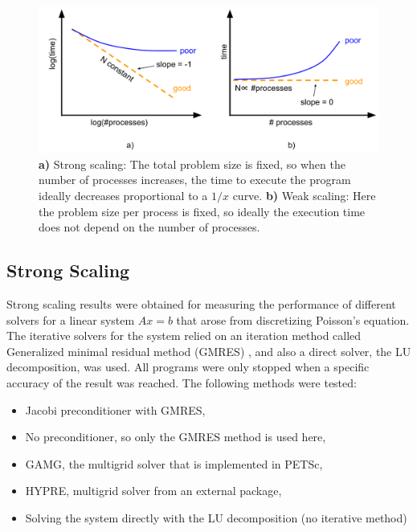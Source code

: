 \begin{figure}[tb]
	\centering
\hspace*{-7mm}	\includegraphics[width=1.\textwidth]{4_strong_weak_scaling}
	\caption{\textbf{a)} Strong scaling: The total problem size is fixed, so when the number of processes increases, the time to execute the program ideally decreases proportional to a $1/x$ curve. \textbf{b)} Weak scaling: Here the problem size per process is fixed, so ideally the execution time does not depend on the number of processes.}
	\label{fig:strong_weak_scaling}
\end{figure}


\subsection{Strong Scaling}


Strong scaling results were obtained for measuring the performance of different solvers for a linear system $Ax = b$ that arose from discretizing Poisson's equation. The iterative solvers for the system relied on an iteration method called Generalized minimal residual method (GMRES) \cite{saad1986gmres}, and also a direct solver, the LU decomposition, was used. All programs were only stopped when a specific accuracy of the result was reached. The following methods were tested:
\begin{itemize}
\item Jacobi preconditioner with GMRES,
\item No preconditioner, so only the GMRES method is used here,
\item GAMG, the multigrid solver that is implemented in PETSc,
\item HYPRE, multigrid solver from an external package,
\item Solving the system directly with the LU decomposition (no iterative method)
\end{itemize}


